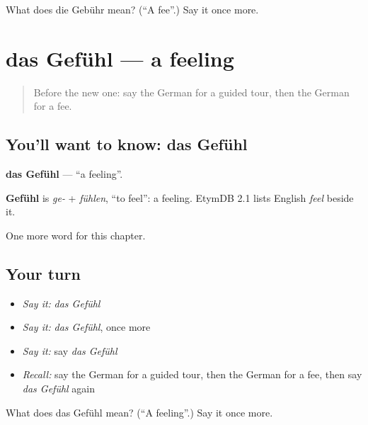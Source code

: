 \begin{tcolorbox}[breakable,colback=teal!4,colframe=teal!35!black,title={Before you move on}]
What does die Gebühr mean? (\textquotedblleft{}A fee\textquotedblright{}.) Say it once more.
\end{tcolorbox}
\section[das Gefühl]{das Gefühl — a feeling}

\label{lesson:GE-C229-gefuehl}



\begin{quote}
Before the new one: say the German for a guided tour, then the German for a fee.
\end{quote}

\subsection*{You'll want to know: das Gefühl}
\textbf{das Gefühl} — \textquotedblleft{}a feeling\textquotedblright{}.

\begin{cousinweb}
\textbf{Gefühl} is \emph{ge-} + \emph{fühlen}, \textquotedblleft{}to feel\textquotedblright{}: a feeling. EtymDB 2.1 lists English \emph{feel} beside it.
\end{cousinweb}

\begin{grammarlens}[title={What you've built}]
One more word for this chapter.
\end{grammarlens}

\subsection*{Your turn}
\begin{itemize}
\raggedright
  \item \emph{Say it:} \emph{das Gefühl}
  \item \emph{Say it:} \emph{das Gefühl}, once more
  \item \emph{Say it:} say \emph{das Gefühl}
  \item \emph{Recall:} say the German for a guided tour, then the German for a fee, then say \emph{das Gefühl} again
\end{itemize}

\begin{tcolorbox}[breakable,colback=teal!4,colframe=teal!35!black,title={Before you move on}]
What does das Gefühl mean? (\textquotedblleft{}A feeling\textquotedblright{}.) Say it once more.
\end{tcolorbox}
